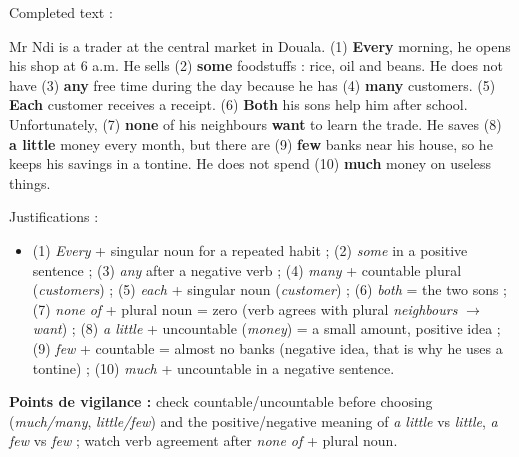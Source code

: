 \documentclass[11pt]{article}
\begin{document}
\begin{corrige}
Completed text :

Mr Ndi is a trader at the central market in Douala. (1) \textbf{Every} morning, he opens his shop at 6 a.m. He sells (2) \textbf{some} foodstuffs : rice, oil and beans. He does not have (3) \textbf{any} free time during the day because he has (4) \textbf{many} customers. (5) \textbf{Each} customer receives a receipt. (6) \textbf{Both} his sons help him after school. Unfortunately, (7) \textbf{none} of his neighbours \textbf{want} to learn the trade. He saves (8) \textbf{a little} money every month, but there are (9) \textbf{few} banks near his house, so he keeps his savings in a tontine. He does not spend (10) \textbf{much} money on useless things.

Justifications :
\begin{itemize}
\item (1) \emph{Every} + singular noun for a repeated habit ; (2) \emph{some} in a positive sentence ; (3) \emph{any} after a negative verb ; (4) \emph{many} + countable plural (\emph{customers}) ; (5) \emph{each} + singular noun (\emph{customer}) ; (6) \emph{both} = the two sons ; (7) \emph{none of} + plural noun = zero (verb agrees with plural \emph{neighbours} $\rightarrow$ \emph{want}) ; (8) \emph{a little} + uncountable (\emph{money}) = a small amount, positive idea ; (9) \emph{few} + countable = almost no banks (negative idea, that is why he uses a tontine) ; (10) \emph{much} + uncountable in a negative sentence.
\end{itemize}
\textbf{Points de vigilance :} check countable/uncountable before choosing (\emph{much/many}, \emph{little/few}) and the positive/negative meaning of \emph{a little} vs \emph{little}, \emph{a few} vs \emph{few} ; watch verb agreement after \emph{none of} + plural noun.
\end{corrige}
\end{document}
